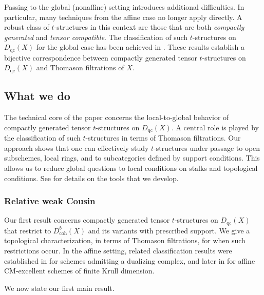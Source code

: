 \documentclass[11pt]{amsart}
\theoremstyle{plain}
\theoremstyle{definition}
\numberwithin{equation}{section}
\numberwithin{theorem}{section}
\begin{document}
Passing to the global (nonaffine) setting introduces additional difficulties. In particular, many techniques from the affine case no longer apply directly. A robust class of $t$-structures in this context are those that are both \textit{compactly generated} and \textit{tensor compatible}. The classification of such $t$-structures on $D_{\operatorname{qc}}(X)$ for the global case has been achieved in \cite{Dubey/Sahoo:2023, Lank:2025}. These results establish a bijective correspondence between compactly generated tensor $t$-structures on $D_{\operatorname{qc}}(X)$ and Thomason filtrations of $X$.

\subsection{What we do}
\label{sec:introduction_what_we_do}

The technical core of the paper concerns the local-to-global behavior of compactly generated tensor $t$-structures on $D_{\operatorname{qc}}(X)$. A central role is played by the classification of such $t$-structures in terms of Thomason filtrations. Our approach shows that one can effectively study $t$-structures under passage to open subschemes, local rings, and to subcategories defined by support conditions. This allows us to reduce global questions to local conditions on stalks and topological conditions. See  for details on the tools that we develop.

\subsubsection{Relative weak Cousin}
\label{sec:introduction_classification}

Our first result concerns compactly generated tensor $t$-structures on $D_{\operatorname{qc}}(X)$ that restrict to $D^b_{\operatorname{coh}}(X)$ and its variants with prescribed support. We give a topological characterization, in terms of Thomason filtrations, for when such restrictions occur. In the affine setting, related classification results were established in \cite{AlonsoTarrio/JeremiasLopez/Saorin:2010} for schemes admitting a dualizing complex, and later in \cite{Takahashi:2023} for affine CM-excellent schemes of finite Krull dimension.

We now state our first main result.
\end{document}
